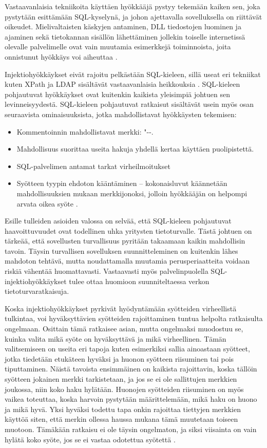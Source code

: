 Vastaavanlaisia tekniikoita käyttäen hyökkääjä pystyy tekemään kaiken sen, joka pystytään esittämään SQL-kyselynä, ja johon ajettavalla
sovelluksella on riittävät oikeudet. Mielivaltaisten käskyjen antaminen, DLL tiedostojen luominen ja ajaminen sekä tietokannan
sisällön lähettäminen jollekin toiselle internetissä olevalle palvelimelle ovat vain muutamia esimerkkejä toiminnoista, joita
onnistunut hyökkäys voi aiheuttaa \cite{SQLSS}.

Injektiohyökkäykset eivät rajoitu pelkästään SQL-kieleen, sillä useat eri tekniikat kuten XPath ja LDAP sisältävät vastaavanlaisia 
heikkouksia \cite{WEB2}. SQL-kieleen pohjautuvat hyökkäykset ovat kuitenkin kaikista yleisimpiä johtuen sen levinneisyydestä. SQL-kieleen
pohjautuvat ratkaisut sisältävät usein myös osan seuraavista ominaisuuksista, jotka mahdollistavat hyökkäysten tekemisen:

\begin{itemize}
\item Kommentoinnin mahdollistavat merkki: "{-}{-}.
\item Mahdollisuus suorittaa useita hakuja yhdellä kertaa käyttäen puolipistettä.
\item SQL-palvelimen antamat tarkat virheilmoitukset
\item Syötteen tyypin ehdoton kääntäminen -- kokonaisluvut käännetään mahdollisuuksien mukaan merkkijonoksi, jolloin hyökkääjän
             on helpompi arvata oikea syöte \cite{SQLSS}.
\end{itemize}

Esille tulleiden asioiden valossa on selvää, että SQL-kieleen pohjautuvat haavoittuvuudet ovat todellinen uhka yritysten tietoturvalle.
Tästä johtuen on tärkeää, että sovellusten turvallisuus pyritään takaamaan kaikin mahdollisin tavoin. Täysin turvallisen sovelluksen 
suunnitteleminen on kuitenkin lähes mahdoton tehtävä, mutta noudattamalla muutamia perusperiaatteita voidaan riskiä vähentää huomattavasti.
Vastaavasti myös palvelinpuolella SQL-injektiohyökkäykset tulee ottaa huomioon suunniteltaessa verkon tietoturvaratkaisuja.

Koska injektiohyökkäykset pyrkivät hyödyntämään syötteiden virheellistä tulkintaa, voi hyväksyttävien syötteiden rajoittaminen tuntua
helpolta ratkaisulta ongelmaan. Osittain tämä ratkaisee asian, mutta ongelmaksi muodostuu se, kuinka valita mikä syöte on hyväksyttävä
ja mikä virheellinen. Tämän valitsemiseen on useita eri tapoja kuten esimerkiksi sallia ainoastaan syötteet, jotka tiedetään etukäteen hyväksi
ja huonon syötteen riisuminen tai pois tiputtaminen. Näistä tavoista ensimmäinen on kaikista rajoittavin, koska tällöin syötteen jokainen 
merkki tarkistetaan, ja jos se ei ole sallittujen merkkien joukossa, niin koko haku hylätään. Huonojen syötteiden riisuminen on myös vaikea
toteuttaa, koska harvoin pystytään määrittelemään, mikä haku on huono ja mikä hyvä. Yksi hyväksi todettu tapa onkin rajoittaa tiettyjen
merkkien käyttöä siten, että merkin ollessa haussa mukana tämä muutetaan toiseen muotoon. Tämäkään ratkaisu ei ole täysin ongelmaton, ja siksi
viisainta on vain hylätä koko syöte, jos se ei vastaa odotettua syötettä \cite{SQLSS}.

